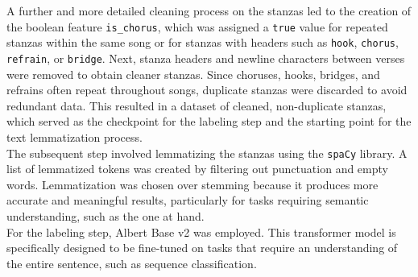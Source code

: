 A further and more detailed cleaning process on the stanzas led to the creation
of the boolean feature \texttt{is\_chorus}, which was assigned a \texttt{true}
value for repeated stanzas within the same song or for stanzas with headers such
as \texttt{hook}, \texttt{chorus}, \texttt{refrain}, or \texttt{bridge}.
Next, stanza headers and newline characters between verses were removed to obtain
cleaner stanzas.
Since choruses, hooks, bridges, and refrains often repeat throughout songs,
duplicate stanzas were discarded to avoid redundant data. This resulted in a
dataset of cleaned, non-duplicate stanzas, which served as the checkpoint for
the labeling step and the starting point for the text lemmatization process.\\

The subsequent step involved lemmatizing the stanzas using the \texttt{spaCy}
library. A list of lemmatized tokens was created by filtering out punctuation
and empty words. Lemmatization was chosen over stemming because it produces
more accurate and meaningful results, particularly for tasks requiring semantic
understanding, such as the one at hand.\\


For the labeling step, Albert Base v2\cite{albert-base-v2}
was employed. This transformer model is specifically designed to be fine-tuned on
tasks that require an understanding of the entire sentence, such as sequence
classification.\\
